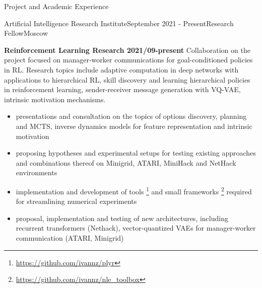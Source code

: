 \documentclass{resume} %
\begin{document}
\begin{rSection}{Project and Academic Experience}

\begin{rSubsection}{Artificial Intelligence Research Institute}{September 2021 - Present}{Research Fellow}{Moscow}
    \item \textbf{Reinforcement Learning Research 2021/09-present}
    Collaboration on the project focused on manager-worker communications for goal-conditioned
    policies in RL.
    Research topics include adaptive computation in deep networks with applications to
    hierarchical RL, skill discovery and learning hierarchical policies in reinforcement
    learning, sender-receiver message generation with VQ-VAE, intrinsic motivation mechanisms.
    \begin{itemize}
        \item presentations and consultation on the topics of options discovery, planning and
        MCTS, inverse dynamics models for feature representation and intrinsic motivation
        \item proposing hypotheses and experimental setups for testing existing approaches
        and combinations thereof on Minigrid, ATARI, MiniHack and NetHack environments
        \item implementation and development of tools%
            \footnote{\url{https://github.com/ivannz/plyr}}
        and small frameworks%
            \footnote{\url{https://github.com/ivannz/nle_toolbox}}
        required for streamlining numerical experiments
        \item proposal, implementation and testing of new architectures, including
        recurrent transformers (Nethack), vector-quantized VAEs for manager-worker
        communication (ATARI, Minigrid)
    \end{itemize}


\end{rSubsection}
\end{rSection}
\end{document}
